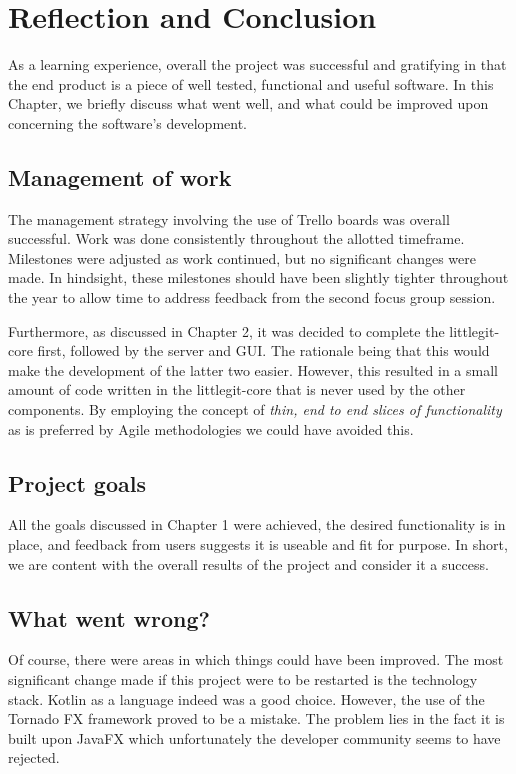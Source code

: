
\chapter{Reflection and Conclusion}

As a learning experience, overall the project was successful and gratifying in that the end product is a piece of well tested, functional and useful software. In this Chapter, we briefly discuss what went well, and what could be improved upon concerning the software's development.

\section{Management of work}

The management strategy involving the use of Trello boards was overall successful. Work was done consistently throughout the allotted timeframe. Milestones were adjusted as work continued, but no significant changes were made. In hindsight, these milestones should have been slightly tighter throughout the year to allow time to address feedback from the second focus group session.

Furthermore, as discussed in Chapter 2, it was decided to complete the littlegit-core first, followed by the server and GUI. The rationale being that this would make the development of the latter two easier. However, this resulted in a small amount of code written in the littlegit-core that is never used by the other components. By employing the concept of \emph{thin, end to end slices of functionality} as is preferred by Agile methodologies we could have avoided this.


\section{Project goals}

All the goals discussed in Chapter 1 were achieved, the desired functionality is in place, and feedback from users suggests it is useable and fit for purpose.  In short, we are content with the overall results of the project and consider it a success.


\section{What went wrong?}

Of course, there were areas in which things could have been improved. The most significant change made if this project were to be restarted is the technology stack. Kotlin as a language indeed was a good choice. However, the use of the Tornado FX framework proved to be a mistake. The problem lies in the fact it is built upon JavaFX which unfortunately the developer community seems to have rejected.

